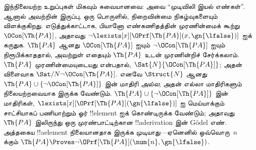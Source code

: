 \documentclass[../../../include/open-logic-section]{subfiles}
\begin{document}
இந்நிலையற்ற உறுப்புகள் மிகவும் சுவையானவை: அவை ``முடிவிலி இயல்
எண்கள்''. ஆனால் அவற்றின் இருப்பு, ஒரு பொருளில், நிறைவின்மை நிகழ்வுகளையும்
விளக்குகிறது. எடுத்துக்காட்டாக, பியானோ எண்கணிதத்தின் முரணின்மைக் கூற்று
$\OCon[\Th{PA}]$, அதாவது $\lnot
\lexists[x][\OPrf[\Th{PA}](x, \gn{\lfalse})]$ ஐக் கருதுக.
$\Th{PA}$ ஆனது $\OCon[\Th{PA}]$ ஐயும் $\lnot \OCon[\Th{PA}]$ ஐயும்
நிரூபிக்காததால், அவற்றுள் எதையும் $\Th{PA}$ உடன் முரணின்றிச் சேர்க்கலாம்.
$\Th{PA}$ முரணின்மையுடையது என்பதால், $\Sat{N}{\OCon[\Th{PA}]}$;
அதன் விளைவாக $\Sat/{N}{\lnot
  \OCon[\Th{PA}]}$. எனவே $\Struct{N}$ ஆனது $\Th{PA}
\cup \{\lnot \OCon[\Th{PA}]\}$ இன் மாதிரி \emph{அல்ல}; அதன் எல்லா
மாதிரிகளும் நிலையற்றவையாக இருக்க வேண்டும். $\Th{PA} \cup
\{\lnot \OCon[\Th{PA}]\}$ இன் மாதிரிகள்,
$\lexists[x][\OPrf[\Th{PA}](\gn{\lfalse})]$ ஐ மெய்யாக்கும் சாட்சியாகப்
பணியாற்றும் ஓர் !!{element} ஐக் கொண்டிருக்க வேண்டும்; அதாவது
~$\Th{PA}$ இலிருந்து ஒரு முரண்பாட்டிற்கான !!a{derivation} இன்
G\"odel எண். அத்தகைய !!a{element} நிலையானதாக இருக்க முடியாது---ஏனெனில்
ஒவ்வொரு~$n$ க்கும் $\Th{PA} \Proves \lnot
\OPrf[\Th{PA}](\num{n}, \gn{\lfalse})$.
\end{document}
